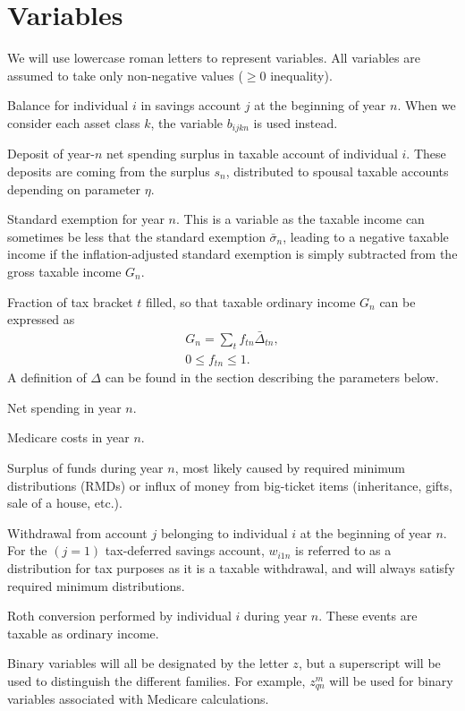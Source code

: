 \documentclass{report}[fleqn,11pt]
\begin{document}
\section{Variables}
We will use lowercase roman letters to represent variables. All variables are assumed
to take only non-negative values ($\ge 0$ inequality).
\begin{description}[leftmargin=4em,style=multiline]
\item [$b_{ijn}$]
	Balance for individual $i$ in savings account $j$ at the beginning of year $n$.
	When we consider each asset class $k$, the variable $b_{ijkn}$ is used instead.
\item [$d_{in}$]
	Deposit of year-$n$ net spending surplus in taxable account of individual $i$.
	These deposits are coming from the surplus $s_n$, distributed to
	spousal taxable accounts depending on parameter $\eta$.
\item [$e_{n}$]
	Standard exemption for year $n$. This is a variable as the taxable income can
        sometimes be less that the standard exemption $\bar{\sigma}_n$, leading to a
	negative taxable income if the inflation-adjusted standard exemption is simply subtracted
	from the gross taxable income $G_n$.
\item [$f_{t n}$]
	Fraction of tax bracket $t$ filled, so that taxable ordinary income $G_n$ can be expressed as
	\begin{eqnarray}
		\label{Eq:Tx1}
		G_n = \sum_t f_{t n}\bar{\Delta}_{t n},\\
		0 \leq f_{t n} \leq 1.
	\end{eqnarray}
	A definition of $\Delta$ can be found in the section describing the parameters below. 
\item [$g_n$]
	Net spending in year $n$.
\item [$m_n$]
	Medicare costs in year $n$.
\item [$s_{n}$]
	Surplus of funds during year $n$, most likely caused by required minimum distributions (RMDs)
	or influx of money from big-ticket items (inheritance, gifts, sale of a house, etc.).
\item [$w_{ijn}$]
	Withdrawal from account $j$ belonging to individual $i$ at the beginning of year $n$.
	For the $(j=1)$ tax-deferred savings account, $w_{i1n}$ is referred to as a distribution for
	tax purposes as it is a taxable withdrawal, and will always satisfy required minimum distributions.
\item [$x_{in}$]
	Roth conversion performed by individual $i$ during year $n$.
	These events are taxable as ordinary income.
\item [$z_{*}$]
	Binary variables will all be designated by the letter $z$, but a superscript will be
	used to distinguish the different families. For example, $z_{qn}^m$ will be used
	for binary variables associated with Medicare calculations.
\end{description}
\end{document}
